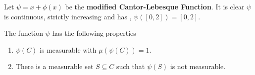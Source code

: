 \begin{definition}
	Let \(\psi = x + \phi\left( x \right) \) be the \textbf{modified Cantor-Lebesque Function}. It is clear \(\psi\) is continuous, strictly increasing and has , \(\psi\left( \left[ 0, 2 \right]  \right)  = \left[ 0, 2 \right] \).
\end{definition}
\begin{proposition}
	The function \(\psi\)  has the following properties
	\begin{enumerate}
		\item \(\psi\left( C \right)\) is measurable with \( \mu\left( \psi \left( C \right)  \right)  = 1\).
		\item There is a measurable set \(S \subseteq C\) such that \(\psi\left( S \right) \) is not measurable.
	\end{enumerate}
\end{proposition}
